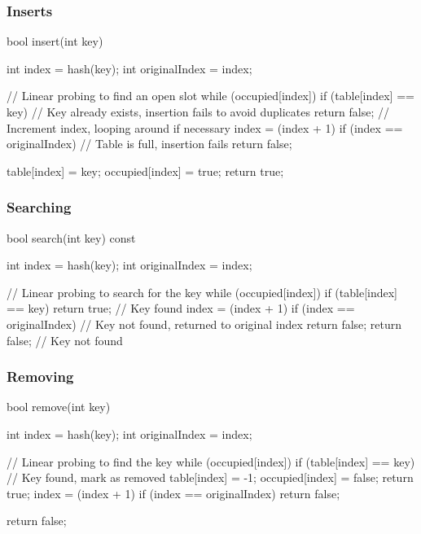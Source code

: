 \documentclass{report}
\begin{document}
\subsubsection{Inserts}
\bigbreak \noindent 
\begin{cppcode}
    bool insert(int key) {
        int index = hash(key);
        int originalIndex = index;

        // Linear probing to find an open slot
        while (occupied[index]) {
            if (table[index] == key) {
                // Key already exists, insertion fails to avoid duplicates
                return false;
            }
            // Increment index, looping around if necessary
            index = (index + 1) %
            if (index == originalIndex) {
                // Table is full, insertion fails
                return false;
            }
        }
        
        table[index] = key;
        occupied[index] = true;
        return true;
    }
\end{cppcode}

\pagebreak \bigbreak \noindent 
\subsubsection{Searching}
\bigbreak \noindent 
\begin{cppcode}
    bool search(int key) const {
        int index = hash(key);
        int originalIndex = index;

        // Linear probing to search for the key
        while (occupied[index]) {
            if (table[index] == key) {
                return true;  // Key found
            }
            index = (index + 1) %
            if (index == originalIndex) {
                // Key not found, returned to original index
                return false;
            }
        }
        return false;  // Key not found
    }
\end{cppcode}
\bigbreak \noindent 
\subsubsection{Removing}
\bigbreak \noindent 
\begin{cppcode}
    bool remove(int key) {
        int index = hash(key);
        int originalIndex = index;

        // Linear probing to find the key
        while (occupied[index]) {
            if (table[index] == key) {
                // Key found, mark as removed
                table[index] = -1;
                occupied[index] = false;
                return true;
            }
            index = (index + 1) %
            if (index == originalIndex) {
                return false;
            }
        }

        return false;
    }
\end{cppcode}
\end{document}
